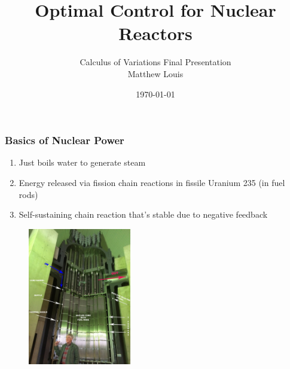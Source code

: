 \documentclass[10pt,compress]{beamer}
\title{Optimal Control for Nuclear Reactors}
\author[M. Louis]%
{Calculus of Variations Final Presentation\texorpdfstring{\\}{}Matthew Louis}
\date{\today}
\begin{document}
{ %
\setlength{\headheight}{0in}


\begin{frame}
\titlepage
\end{frame}
}
\addtocounter{framenumber}{-1}



\begin{frame}\frametitle{Basics of Nuclear Power}
    \begin{enumerate}
        \item Just boils water to generate steam
        \item Energy released via fission chain reactions in fissile Uranium 235 (in fuel rods)
        \item Self-sustaining chain reaction that's stable due to negative feedback
    \end{enumerate}
    \begin{figure}
        \includegraphics[width=0.4\textwidth]{images/core-cutaway.jpg}
    \end{figure}
\end{frame}
\end{document}
